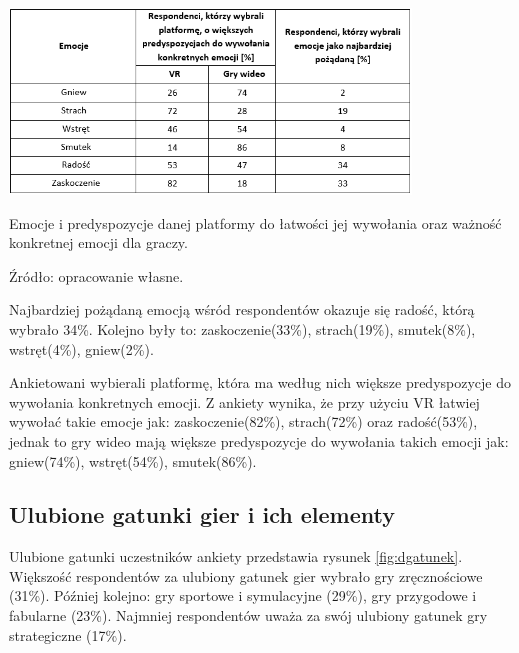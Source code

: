 \begin{table}[htb]
  \centering
  \includegraphics[width=0.8\textwidth]{images/tpredyspozycje.PNG}
  \caption{Emocje i predyspozycje danej platformy do łatwości jej wywołania oraz ważność konkretnej emocji dla graczy.}
  \caption*{Źródło: opracowanie własne.}
  \label{tbl:tpredyspozycje}
\end{table}

Najbardziej pożądaną emocją wśród respondentów okazuje się radość, którą wybrało 34\%. Kolejno były to: zaskoczenie(33\%), strach(19\%), smutek(8\%), wstręt(4\%), gniew(2\%).


Ankietowani wybierali platformę, która ma według nich większe predyspozycje do wywołania konkretnych emocji. Z ankiety wynika, że przy użyciu VR łatwiej wywołać takie emocje jak: zaskoczenie(82\%), strach(72\%) oraz radość(53\%), jednak to gry wideo mają większe predyspozycje do wywołania takich emocji jak: gniew(74\%), wstręt(54\%), smutek(86\%). 

\subsection{Ulubione gatunki gier i ich elementy}

Ulubione gatunki uczestników ankiety przedstawia rysunek \ref{fig:dgatunek}. Większość respondentów za ulubiony gatunek gier wybrało gry zręcznościowe (31\%). Później kolejno: gry sportowe i symulacyjne (29\%), gry przygodowe i fabularne (23\%). Najmniej respondentów uważa za swój ulubiony gatunek gry strategiczne (17\%).

